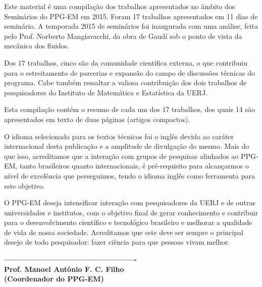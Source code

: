 \documentclass[11pt,a4paper]{book} %
\newcommand{\numpaperspt}{14 }
\begin{document}

\vspace*{-28mm}
\hspace*{-12mm}
\begin{minipage}[t]{.55\textwidth}
	Este material é uma compilação dos trabalhos apresentados no âmbito dos Seminários do PPG-EM em 2015. Foram 17 trabalhos apresentados em 11 dias de seminário. A temporada 2015 de seminários foi inaugurada com uma análise, feita pelo Prof. Norberto Mangiavacchi, da obra de Gaudí sob o ponto de vista da mecânica dos fluidos. 
	
	Dos 17 trabalhos, cinco são da comunidade científica externa, o que contribuiu para o estreitamento de parcerias e expansão do campo de discussões técnicas do programa. Cabe também ressaltar a valiosa contribuição dos dois trabalhos de pesquisadores do Instituto de Matemática e Estatística da UERJ.
	
	Esta compilação contém o resumo de cada um dos 17 trabalhos, dos quais \numpaperspt são apresentados em texto de duas páginas (artigos compactos). 
	
	O idioma selecionado para os textos técnicos foi o inglês devido ao caráter internacional desta publicação e a amplitude de divulgação do mesmo. Mais do que isso, acreditamos que a interação com grupos de pesquisas alinhados ao PPG-EM, tanto brasileiros quanto internacionais, é pré-requisito para alcançarmos o nível de excelência que perseguimos, tendo o idioma inglês como ferramenta para este objetivo. 
	
	O PPG-EM deseja intensificar interação com pesquisadores da UERJ e de outras universidades e institutos, com o objetivo final de gerar conhecimento e contribuir para o desenvolvimento científico e tecnológico brasileiro e melhorar a qualidade de vida de nossa sociedade. Acreditamos que este deve ser sempre o principal desejo de todo pesquisador: fazer ciência para que pessoas vivam melhor.
	
	\vspace*{10mm}
	\begin{center}
		\textbf{-------------------------------------------------\\
				Prof. Manoel Antônio F. C. Filho\\
				(Coordenador do PPG-EM)}
	\end{center}
	
\end{minipage}
\hspace*{8mm}
\end{document}
